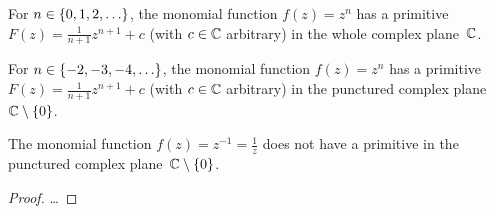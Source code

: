 \begin{lemma}
  \label{lem:monomial_primitive}
  For $n \in \left\{ 0,1,2,\ldots \right\}$, the monomial
  function $f(z) = z^n$ has a primitive
  $F(z) = \frac{1}{n+1} z^{n+1} + c$ (with $c \in \mathbb{C}$ arbitrary)
  in the whole complex plane~$\mathbb{C}$.

  For $n \in \left\{ -2,-3,-4,\ldots \right\}$, the monomial
  function $f(z) = z^n$ has a primitive
  $F(z) = \frac{1}{n+1} z^{n+1} + c$ (with $c \in \mathbb{C}$ arbitrary)
  in the punctured complex plane~$\mathbb{C} \setminus \left\{ 0 \right\}$.

  The monomial function $f(z) = z^{-1} = \frac{1}{z}$ does not have
  a primitive in the punctured complex plane~$\mathbb{C} \setminus \left\{ 0 \right\}$.
\end{lemma}
\begin{proof}
  \ldots
\end{proof}
